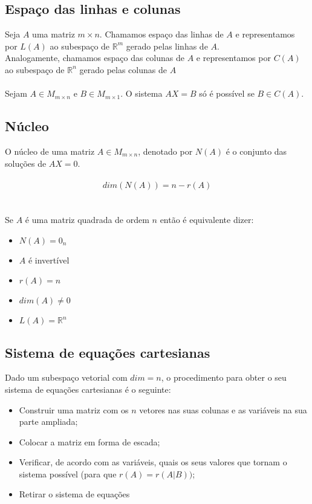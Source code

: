 \documentclass[10pt,a4paper]{report}
\begin{document}
\subsection{Espaço das linhas e colunas}
Seja $A$ uma matriz $m \times n$. Chamamos espaço das linhas de $A$ e representamos por $L(A)$ ao subespaço de $\mathbb{R}^m$ gerado pelas linhas de $A$.\\
Analogamente, chamamos espaço das colunas de $A$ e representamos por $C(A)$ ao subespaço de $\mathbb{R}^n$ gerado pelas colunas de $A$\\
\\
Sejam $A \in M_{m\times n}$ e $B \in M_{m\times 1}$. O sistema $AX = B$ só é possível se $B \in C(A)$.

\subsection{Núcleo}
O núcleo de uma matriz $A \in M_{m\times n}$, denotado por $N(A)$ é o conjunto das soluções de $AX=0$.\\
\\
$$
dim(N(A)) = n - r(A)
$$\\
\\
Se $A$ é uma matriz quadrada de ordem $n$ então é equivalente dizer:
\begin{itemize}
\item $N(A) = 0_n$
\item $A$ é invertível
\item $r(A) = n$
\item $dim(A) \neq 0$
\item $L(A) = \mathbb{R}^n$
\end{itemize}

\subsection{Sistema de equações cartesianas}
Dado um subespaço vetorial com $dim = n$, o procedimento para obter o seu sistema de equações cartesianas é o seguinte:
\begin{itemize}
\item Construir uma matriz com os $n$ vetores nas suas colunas e as variáveis na sua parte ampliada;
\item Colocar a matriz em forma de escada;
\item Verificar, de acordo com as variáveis, quais os seus valores que tornam o sistema possível (para que $r(A) = r(A|B))$;
\item Retirar o sistema de equações 
\end{itemize} 
\end{document}
